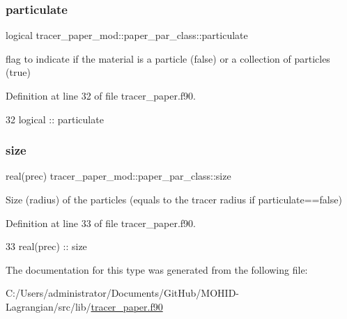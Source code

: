 \subsubsection{\texorpdfstring{particulate}{particulate}}
{\footnotesize\ttfamily logical tracer\+\_\+paper\+\_\+mod\+::paper\+\_\+par\+\_\+class\+::particulate\hspace{0.3cm}{\ttfamily [private]}}



flag to indicate if the material is a particle (false) or a collection of particles (true) 



Definition at line 32 of file tracer\+\_\+paper.\+f90.


\begin{DoxyCode}
32         \textcolor{keywordtype}{logical}    :: particulate
\end{DoxyCode}
\mbox{\label{structtracer__paper__mod_1_1paper__par__class_aeb0b4d046983cd2f631822e80e1600c4}} 
\subsubsection{\texorpdfstring{size}{size}}
{\footnotesize\ttfamily real(prec) tracer\+\_\+paper\+\_\+mod\+::paper\+\_\+par\+\_\+class\+::size\hspace{0.3cm}{\ttfamily [private]}}



Size (radius) of the particles (equals to the tracer radius if particulate==false) 



Definition at line 33 of file tracer\+\_\+paper.\+f90.


\begin{DoxyCode}
33         \textcolor{keywordtype}{real(prec)} :: size
\end{DoxyCode}


The documentation for this type was generated from the following file\+:\begin{DoxyCompactItemize}
\item 
C\+:/\+Users/administrator/\+Documents/\+Git\+Hub/\+M\+O\+H\+I\+D-\/\+Lagrangian/src/lib/\mbox{\hyperlink{tracer__paper_8f90}{tracer\+\_\+paper.\+f90}}\end{DoxyCompactItemize}
